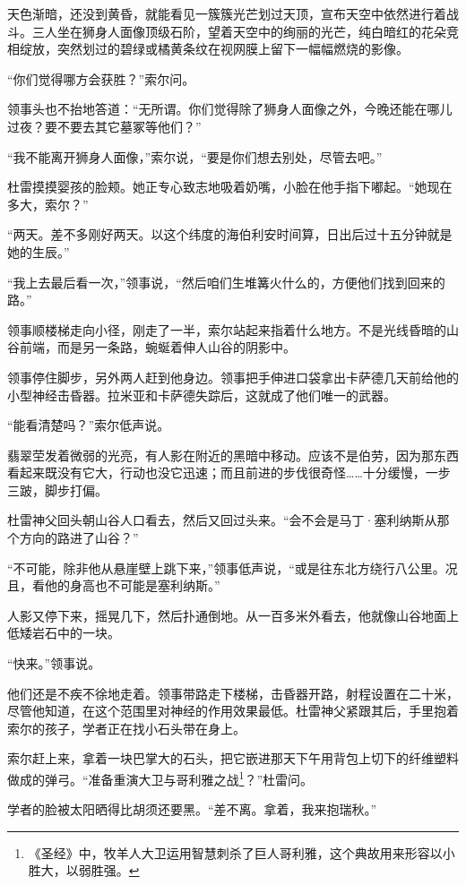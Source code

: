 \documentclass[AutoFakeBold=true]{book}
\begin{document}
天色渐暗，还没到黄昏，就能看见一簇簇光芒划过天顶，宣布天空中依然进行着战斗。三人坐在狮身人面像顶级石阶，望着天空中的绚丽的光芒，纯白暗红的花朵竞相绽放，突然划过的碧绿或橘黄条纹在视网膜上留下一幅幅燃烧的影像。

``你们觉得哪方会获胜？''索尔问。

领事头也不抬地答道：``无所谓。你们觉得除了狮身人面像之外，今晚还能在哪儿过夜？要不要去其它墓冢等他们？''

``我不能离开狮身人面像，''索尔说，``要是你们想去别处，尽管去吧。''

杜雷摸摸婴孩的脸颊。她正专心致志地吸着奶嘴，小脸在他手指下嘟起。``她现在多大，索尔？''

``两天。差不多刚好两天。以这个纬度的海伯利安时间算，日出后过十五分钟就是她的生辰。''

``我上去最后看一次，''领事说，``然后咱们生堆篝火什么的，方便他们找到回来的路。''

领事顺楼梯走向小径，刚走了一半，索尔站起来指着什么地方。不是光线昏暗的山谷前端，而是另一条路，蜿蜒着伸人山谷的阴影中。

领事停住脚步，另外两人赶到他身边。领事把手伸进口袋拿出卡萨德几天前给他的小型神经击昏器。拉米亚和卡萨德失踪后，这就成了他们唯一的武器。

``能看清楚吗？''索尔低声说。

翡翠茔发着微弱的光亮，有人影在附近的黑暗中移动。应该不是伯劳，因为那东西看起来既没有它大，行动也没它迅速；而且前进的步伐很奇怪……十分缓慢，一步三跛，脚步打偏。

杜雷神父回头朝山谷人口看去，然后又回过头来。``会不会是马丁·塞利纳斯从那个方向的路进了山谷？''

``不可能，除非他从悬崖壁上跳下来，''领事低声说，``或是往东北方绕行八公里。况且，看他的身高也不可能是塞利纳斯。''

人影又停下来，摇晃几下，然后扑通倒地。从一百多米外看去，他就像山谷地面上低矮岩石中的一块。

``快来。''领事说。

他们还是不疾不徐地走着。领事带路走下楼梯，击昏器开路，射程设置在二十米，尽管他知道，在这个范围里对神经的作用效果最低。杜雷神父紧跟其后，手里抱着索尔的孩子，学者正在找小石头带在身上。

索尔赶上来，拿着一块巴掌大的石头，把它嵌进那天下午用背包上切下的纤维塑料做成的弹弓。``准备重演大卫与哥利雅之战\footnote{《圣经》中，牧羊人大卫运用智慧刺杀了巨人哥利雅，这个典故用来形容以小胜大，以弱胜强。}？''杜雷问。

学者的脸被太阳晒得比胡须还要黑。``差不离。拿着，我来抱瑞秋。''
\end{document}

